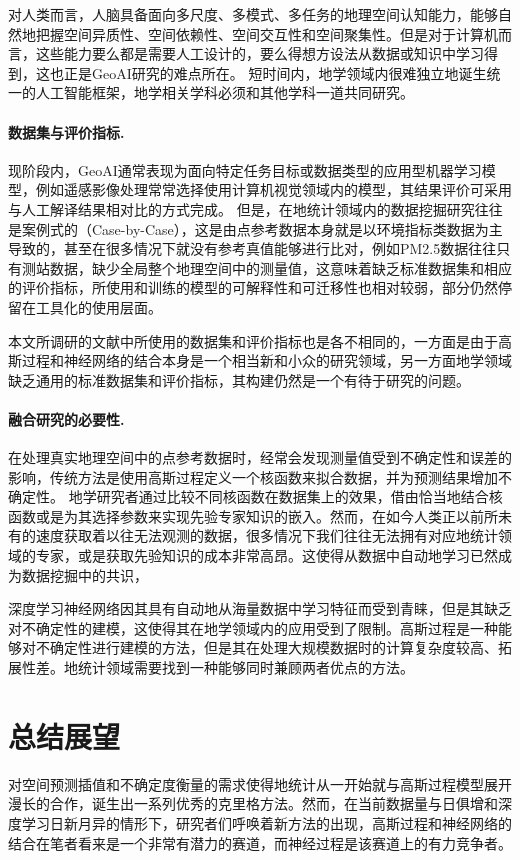 \documentclass[final]{cvpr}
\newcommand{\mypara}[1]{\paragraph{#1.}}
\begin{document}
对人类而言，人脑具备面向多尺度、多模式、多任务的地理空间认知能力，能够自然地把握空间异质性、空间依赖性、空间交互性和空间聚集性\cite{liu2022note}。但是对于计算机而言，这些能力要么都是需要人工设计的，要么得想方设法从数据或知识中学习得到，这也正是GeoAI研究的难点所在。
短时间内，地学领域内很难独立地诞生统一的人工智能框架，地学相关学科必须和其他学科一道共同研究。

\mypara{数据集与评价指标}
现阶段内，GeoAI通常表现为面向特定任务目标或数据类型的应用型机器学习模型，例如遥感影像处理常常选择使用计算机视觉领域内的模型\cite{zhang2022artificial}，其结果评价可采用与人工解译结果相对比的方式完成。
但是，在地统计领域内的数据挖掘研究往往是案例式的（Case-by-Case），这是由点参考数据本身就是以环境指标类数据为主导致的，甚至在很多情况下就没有参考真值能够进行比对，例如PM2.5数据往往只有测站数据，缺少全局整个地理空间中的测量值，这意味着缺乏标准数据集和相应的评价指标，所使用和训练的模型的可解释性和可迁移性也相对较弱，部分仍然停留在工具化的使用层面\cite{gao2020geo}。

本文所调研的文献中所使用的数据集和评价指标也是各不相同的，一方面是由于高斯过程和神经网络的结合本身是一个相当新和小众的研究领域，另一方面地学领域缺乏通用的标准数据集和评价指标，其构建仍然是一个有待于研究的问题。

\mypara{融合研究的必要性}
在处理真实地理空间中的点参考数据时，经常会发现测量值受到不确定性和误差的影响，传统方法是使用高斯过程定义一个核函数来拟合数据，并为预测结果增加不确定性。
地学研究者通过比较不同核函数在数据集上的效果，借由恰当地结合核函数或是为其选择参数来实现先验专家知识的嵌入\cite{pretorius2020expected}。然而，在如今人类正以前所未有的速度获取着以往无法观测的数据，很多情况下我们往往无法拥有对应地统计领域的专家，或是获取先验知识的成本非常高昂。这使得从数据中自动地学习已然成为数据挖掘中的共识，

深度学习神经网络因其具有自动地从海量数据中学习特征而受到青睐，但是其缺乏对不确定性的建模，这使得其在地学领域内的应用受到了限制。高斯过程是一种能够对不确定性进行建模的方法，但是其在处理大规模数据时的计算复杂度较高、拓展性差。地统计领域需要找到一种能够同时兼顾两者优点的方法。

\section{总结展望}\label{sec:conclusion}

对空间预测插值和不确定度衡量的需求使得地统计从一开始就与高斯过程模型展开漫长的合作，诞生出一系列优秀的克里格方法。然而，在当前数据量与日俱增和深度学习日新月异的情形下，研究者们呼唤着新方法的出现，高斯过程和神经网络的结合在笔者看来是一个非常有潜力的赛道，而神经过程是该赛道上的有力竞争者。
\end{document}
